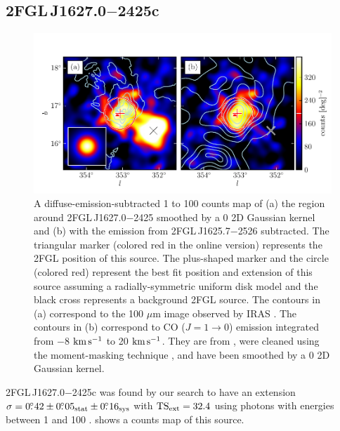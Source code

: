 \subsection{2FGL\,J1627.0$-$2425c}

\begin{figure}[htbp]
  \includegraphics{source_plots/source_Ophiuchus_color.pdf}
  \caption{A diffuse-emission-subtracted 1 \gev to 100 \gev counts map
  of (a) the region around 2FGL\,J1627.0$-$2425 smoothed by a 0 2D
  Gaussian kernel and (b) with the emission from 2FGL\,J1625.7$-$2526
  subtracted.  The triangular marker (colored red in the online version)
  represents the 2FGL position of this source.  The plus-shaped
  marker and the circle (colored red) represent the best fit position
  and extension of this source assuming a radially-symmetric uniform
  disk model and the black cross represents a background 2FGL source.
  The contours in (a) correspond to the 100 $\mu$m image observed by
  IRAS \citep{young_1986a_high-resolution-observations}.  The contours
  in (b) correspond to CO ($J=1\rightarrow 0$) emission integrated
  from $-$8 $\text{km}\,\text{s}^{-1}$ to 20 $\text{km}\,\text{s}^{-1}$.  They are
  from \cite{de-geus_1990a_survey-clouds}, were cleaned using the
  moment-masking technique \citep{dame_2011a_optimization-moment},
  and have been smoothed by a 0 2D Gaussian kernel.}
\end{figure}

2FGL\,J1627.0$-$2425c was found by our search to have an extension
$\sigma=0\mbox{$.\!\!^\circ$}42\pm0\mbox{$.\!\!^\circ$}05_\text{stat}\pm0\mbox{$.\!\!^\circ$}16_\text{sys}$ with $\mathrm{TS}_\mathrm{ext}=32.4$
using photons with energies between 1 \gev and 100 \gev.
 shows a counts map of this source.

